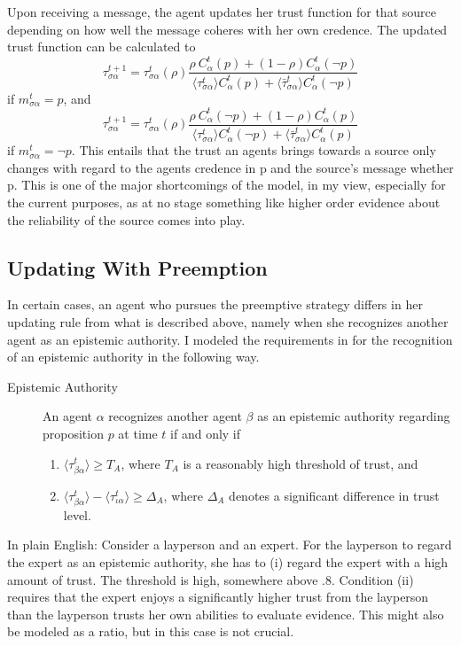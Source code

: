 \documentclass[11pt, a4paper]{scrartcl}
\newcommand{\sa}{{\sigma\alpha}}
\renewcommand{\a}{\alpha}
\begin{document}
Upon receiving a message, the agent updates her trust function for that source depending on how well the message coheres with her own credence. The updated trust function can be calculated to
\[
    \tau^{t+1}_\sa = \tau^t_\sa (\rho) \frac{\rho \: C^t_\a (p) + (1 - \rho) C^t_\a (\neg p)}
    {\langle \tau^t_\sa \rangle C^t_\a(p) + \langle \bar{\tau}^t_\sa \rangle C^t_\a(\neg p)}
\]
if $m^t_{\sa} = p$, and 
\[
    \tau^{t+1}_\sa = \tau^t_\sa (\rho) \frac{\rho \: C^t_\a (\neg p) + (1 - \rho) C^t_\a (p)}
    {\langle \tau^t_\sa \rangle C^t_\a(\neg p) + \langle \bar{\tau}^t_\sa \rangle C^t_\a(p)}
\]
if $m^t_{\sa} = \neg p$. This entails that the trust an agents brings towards a source only changes with regard to the agents credence in p and the source's message whether p. This is one of the major shortcomings of the model, in my view, especially for the current purposes, as at no stage something like higher order evidence about the reliability of the source comes into play. 

\subsection{Updating With Preemption}

In certain cases, an agent who pursues the preemptive strategy differs in her updating rule from what is described above, namely when she recognizes another agent as an epistemic authority. I modeled the requirements in \textcite[p.9]{Constantin2017} for the recognition of an epistemic authority in the following way. 
\begin{description} 
    \item[Epistemic Authority] An agent $\alpha$ recognizes another agent $\beta$ as an epistemic authority regarding proposition $p$ at time $t$ if and only if  
    \begin{enumerate}[label= (\roman*)]
        \item $\langle \tau^t_{\beta\alpha} \rangle \geqslant T_A$, where $T_A$ is a reasonably high threshold of trust, and
        \item $\langle \tau^t_{\beta\alpha} \rangle - \langle \tau^t_{\iota\alpha} \rangle \geqslant \Delta_A$, where $\Delta_A$ denotes a significant difference in trust level.
    \end{enumerate}


\end{description}
    In plain English: Consider a layperson and an expert. For the layperson to regard the expert as an epistemic authority, she has to (i) regard the expert with a high amount of trust. The threshold is high, somewhere above $.8$. Condition (ii) requires that the expert enjoys a significantly higher trust from the layperson than the layperson trusts her own abilities to evaluate evidence. This might also be modeled as a ratio, but in this case is not crucial.
\end{document}
